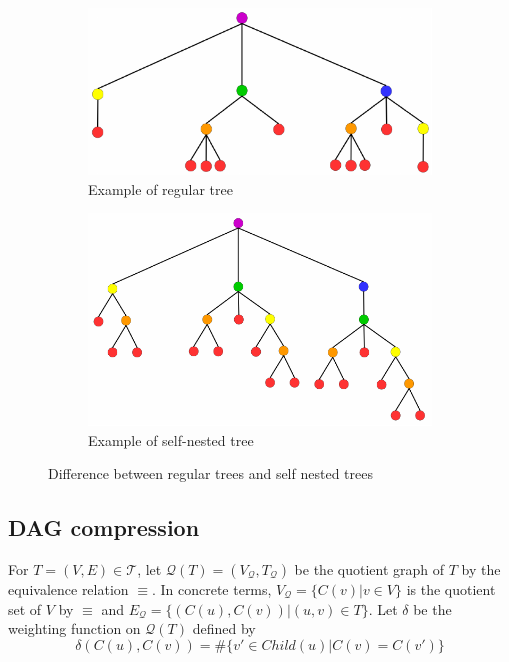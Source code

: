 \begin{figure}[h]
 \begin{subfigure}[b]{0.45\textwidth}
    \centering  
    \includegraphics[width=\textwidth]{figures/tree2.pdf}
    \caption{Example of regular tree}
    \label{fig:treeexample}
  \end{subfigure}
  \quad
  \begin{subfigure}[b]{0.45\textwidth}
    \centering  
    \includegraphics[width=\textwidth]{figures/tree.pdf}
    \caption{Example of self-nested tree}
    \label{fig:SNtree}
  \end{subfigure}
 
  \caption{Difference between regular trees and self nested trees}
\end{figure}

\subsection{DAG compression}

For $T = (V,E) \in \mathcal{T}$, let 
$\mathcal{Q}(T) = (V_{\mathcal{Q}}, T_{\mathcal{Q}})$ be the quotient
graph of $T$
by the equivalence relation $\equiv$. In concrete terms,
$V_{\mathcal{Q}} = \{ C(v) | v \in V \}$ is the quotient set of $V$ by
$\equiv$ and 
${E_{\mathcal{Q}} = \{ (C(u), C(v)) | (u,v) \in T \}}$.
Let $\delta$ be the weighting function on $\mathcal{Q}(T)$
defined by $$\delta(C(u), C(v)) = \#\{ v' \in Child(u) | C(v) = C(v')\}$$

